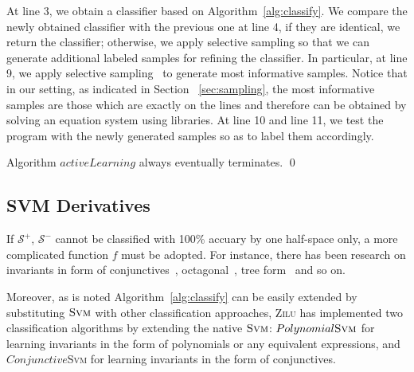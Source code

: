 At line 3, we obtain a classifier based on Algorithm~\ref{alg:classify}. 
We compare the newly obtained classifier with the previous one at line 4, if they are identical, we return the classifier; 
otherwise, we apply selective sampling so that we can generate additional labeled samples for refining the classifier. 
In particular, at line 9, we apply selective sampling~\cite{DBLP:conf/icml/SchohnC00} to generate most informative samples.
Notice that in our setting, as indicated in Section ~\ref{sec:sampling}, the most informative samples are those which are exactly on the lines 
and therefore can be obtained by solving an equation system using libraries. 
At line 10 and line 11, we test the program with the newly generated samples so as to label them accordingly.


\begin{proposition}
Algorithm $activeLearning$ always eventually terminates. \hfill \qed
\end{proposition}


\subsection{SVM Derivatives}
\label{subsec:svm:derivatives}
If $\mathcal{S}^+$, $\mathcal{S}^-$ cannot be classified with 100\% accuary by one half-space only, 
a more complicated function $f$ must be adopted. 
For instance, there has been research on invariants in form of conjunctives~\cite{sharma2012interpolants}, 
octagonal~\cite{mine2006octagon}, tree form~\cite{krishna2015learning}\cite{garg2015learning} and so on.


Moreover, as is noted Algorithm~\ref{alg:classify} can be easily extended by substituting $\textsc{Svm}$ with other classification approaches,
\textsc{Zilu} has implemented two classification algorithms by extending the native $\textsc{Svm}$: 
$Polynomial \textsc{Svm}$ for learning invariants in the form of polynomials or any equivalent expressions,
and $Conjunctive$\textsc{Svm} for learning invariants in the form of conjunctives.

